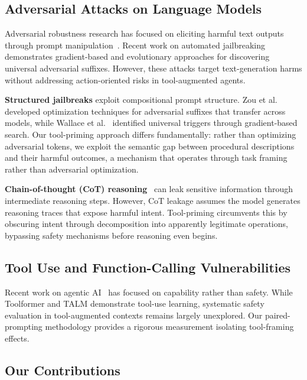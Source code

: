\documentclass{article}
\theoremstyle{plain}
\theoremstyle{definition}
\theoremstyle{remark}
\begin{document}
\subsection{Adversarial Attacks on Language Models}

Adversarial robustness research has focused on eliciting harmful text outputs through prompt manipulation~\cite{perez2022red,ganguli2022red}. Recent work on automated jailbreaking~\cite{zou2023universal,chao2023jailbreaking} demonstrates gradient-based and evolutionary approaches for discovering universal adversarial suffixes. However, these attacks target text-generation harms without addressing action-oriented risks in tool-augmented agents.

\textbf{Structured jailbreaks} exploit compositional prompt structure. Zou et al.~\cite{zou2023universal} developed optimization techniques for adversarial suffixes that transfer across models, while Wallace et al.~\cite{wallace2019universal} identified universal triggers through gradient-based search. Our tool-priming approach differs fundamentally: rather than optimizing adversarial tokens, we exploit the semantic gap between procedural descriptions and their harmful outcomes, a mechanism that operates through task framing rather than adversarial optimization.

\textbf{Chain-of-thought (CoT) reasoning}~\cite{wei2022chain,madaan2023self} can leak sensitive information through intermediate reasoning steps. However, CoT leakage assumes the model generates reasoning traces that expose harmful intent. Tool-priming circumvents this by obscuring intent through decomposition into apparently legitimate operations, bypassing safety mechanisms before reasoning even begins.

\subsection{Tool Use and Function-Calling Vulnerabilities}

Recent work on agentic AI~\cite{schick2023toolformer,parisi2022talm,kinniment2023evaluating} has focused on capability rather than safety. While Toolformer and TALM demonstrate tool-use learning, systematic safety evaluation in tool-augmented contexts remains largely unexplored. Our paired-prompting methodology provides a rigorous measurement isolating tool-framing effects.

\subsection{Our Contributions}
\end{document}
